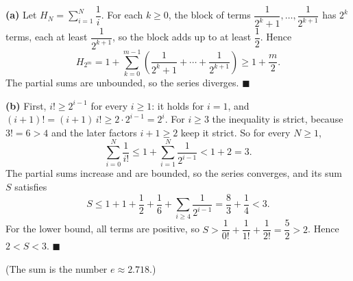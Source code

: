 \textbf{(a)} Let $H_N=\displaystyle\sum_{i=1}^N\dfrac1i$. For each $k\ge0$, the block of terms $\dfrac1{2^k+1},\dots,\dfrac1{2^{k+1}}$ has $2^k$ terms, each at least $\dfrac{1}{2^{k+1}}$, so the block adds up to at least $\dfrac12$. Hence
\[H_{2^m}=1+\sum_{k=0}^{m-1}\left(\dfrac1{2^k+1}+\cdots+\dfrac1{2^{k+1}}\right)\ge1+\dfrac m2.\]
The partial sums are unbounded, so the series diverges. $\blacksquare$

\textbf{(b)} First, $i!\ge2^{i-1}$ for every $i\ge1$: it holds for $i=1$, and $(i+1)!=(i+1)\,i!\ge2\cdot2^{i-1}=2^i$. For $i\ge3$ the inequality is strict, because $3!=6>4$ and the later factors $i+1\ge2$ keep it strict. So for every $N\ge1$,
\[\sum_{i=0}^{N}\dfrac1{i!}\le1+\sum_{i=1}^{N}\dfrac1{2^{i-1}}<1+2=3.\]
The partial sums increase and are bounded, so the series converges, and its sum $S$ satisfies
\[S\le1+1+\dfrac12+\dfrac16+\sum_{i\ge4}\dfrac1{2^{i-1}}=\dfrac83+\dfrac14<3.\]
For the lower bound, all terms are positive, so $S>\dfrac1{0!}+\dfrac1{1!}+\dfrac1{2!}=\dfrac52>2$. Hence $2<S<3$. $\blacksquare$

(The sum is the number $e\approx2.718$.)
